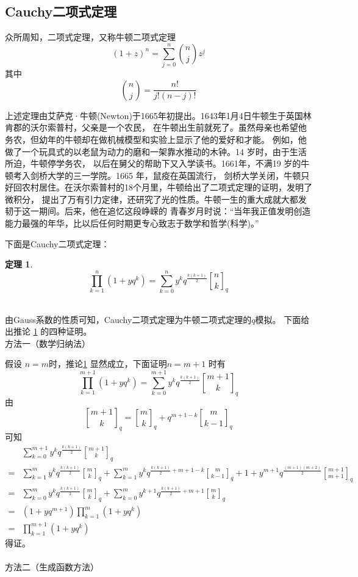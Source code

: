 \documentclass[a4paper,12pt]{ctexart}
\newtheorem{theo}{定理}[section]
\begin{document}
\subsection{Cauchy二项式定理}

众所周知，二项式定理，又称牛顿二项式定理
\begin{equation}
	(1+z)^n=\sum_{j=0}^{n} {n \choose j} z^{j}
\end{equation}
其中
$$
{n \choose j}= \frac{n!}{j!(n-j)!}
$$

上述定理由艾萨克·牛顿(Newton)于1665年初提出。1643年1月4日牛顿生于英国林肯郡的沃尔索普村，父亲是一个农民，
在牛顿出生前就死了。虽然母亲也希望他务农，但幼年的牛顿却在做机械模型和实验上显示了他的爱好和才能。
例如，他做了一个玩具式的以老鼠为动力的磨和一架靠水推动的木钟。14 岁时，由于生活所迫，牛顿停学务农，
以后在舅父的帮助下又入学读书。1661年，不满19 岁的牛顿考入剑桥大学的三一学院。1665 年，鼠疫在英国流行，
剑桥大学关闭，牛顿只好回农村居住。在沃尔索普村的18个月里，牛顿给出了二项式定理的证明，发明了微积分，
提出了万有引力定律，还研究了光的性质。牛顿一生的重大成就大都发韧于这一期间。后来，他在追忆这段峥嵘的
青春岁月时说：“当年我正值发明创造能力最强的年华，比以后任何时期更专心致志于数学和哲学(科学)。”


下面是Cauchy二项式定理：
\begin{theo}
	\label{coro-cauchy binomial}
	\begin{equation*}
		\prod_{k=1}^{n}(1+yq^k)=\sum_{k=0}^{n}y^k q^{\frac{k(k+1)}{2}} {n \brack k}_q
	\end{equation*}
\end{theo}
~\\
由Gauss系数的性质可知，Cauchy二项式定理为牛顿二项式定理的$q$模拟。
下面给出推论 \ref{coro-cauchy binomial} 的四种证明。\\
方法一（数学归纳法）

假设 $n=m$时，推论\ref{coro-cauchy binomial} 显然成立，下面证明$n=m+1$ 时有
\begin{equation*}
	\prod_{k=1}^{m+1}(1+yq^k)=\sum_{k=0}^{m+1}y^k q^{\frac{k(k+1)}{2}} {{m+1}\brack k}_q
\end{equation*}
由
$$
{{m+1}\brack k}_q= {{m}\brack k}_q+ q^{m+1-k}{{m}\brack {k-1}}_q
$$
可知
\begin{align*}
	&\sum_{k=0}^{m+1}y^k q^{\frac{k(k+1)}{2}} {{m+1}\brack k}_q\\
	=&\sum_{k=1}^{m}y^k q^{\frac{k(k+1)}{2}} {{m}\brack k}_q +\sum_{k=1}^{m}y^k q^{\frac{k(k+1)}{2}+m+1-k} {{m}\brack {k-1}}_q
	+1+y^{m+1} q^{\frac{(m+1)(m+2)}{2}} {{m+1}\brack {m+1}}_q\\
	=&\sum_{k=0}^{m}y^k q^{\frac{k(k+1)}{2}} {{m}\brack k}_q +\sum_{k=0}^{m}y^{k+1} q^{\frac{k(k+1)}{2}+m+1} {{m}\brack k}_q \\
	=&(1+yq^{m+1})\prod_{k=1}^{m}(1+yq^k)\\
	=&\prod_{k=1}^{m+1}(1+yq^k)
\end{align*}
得证。\\
~\\
方法二（生成函数方法）
\end{document}

